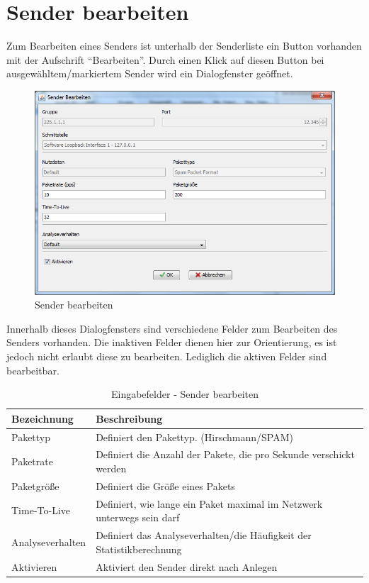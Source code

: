 \chapter{Sender bearbeiten}
Zum Bearbeiten eines Senders ist unterhalb der Senderliste
ein Button vorhanden mit der Aufschrift ``Bearbeiten''. Durch einen Klick auf
diesen Button bei ausgewähltem/markiertem Sender wird ein Dialogfenster
geöffnet.

\begin{figure}[htbp]
\begin{center}
\includegraphics[width=14cm]{images/editSender.png}
\caption[Sender bearbeiten]{Sender bearbeiten}
\label{newReceiver}
\end{center}
\end{figure}

Innerhalb dieses Dialogfensters sind verschiedene Felder zum Bearbeiten des
Senders vorhanden. Die inaktiven Felder dienen hier zur Orientierung, es ist
jedoch nicht erlaubt diese zu bearbeiten. Lediglich die aktiven Felder sind
bearbeitbar.

\begin{table}[h]
\caption{Eingabefelder - Sender bearbeiten}
\label{tab:inputEditSender}
\begin{center}
\begin{tabular}{|l|p{10cm}|}
\hline
\textbf{Bezeichnung} & \textbf{Beschreibung}\\
\hline
Pakettyp & Definiert den Pakettyp. (Hirschmann/SPAM)\\
\hline
Paketrate & Definiert die Anzahl der Pakete, die pro Sekunde verschickt werden\\
\hline
Paketgröße & Definiert die Größe eines Pakets\\
\hline
Time-To-Live & Definiert, wie lange ein Paket maximal im Netzwerk unterwegs sein
darf\\
\hline
Analyseverhalten & Definiert das Analyseverhalten/die Häufigkeit der
Statistikberechnung\\
\hline
 Aktivieren & Aktiviert den Sender direkt nach Anlegen\\
\hline
\end{tabular}
\end{center}
\label{default}
\end{table}

